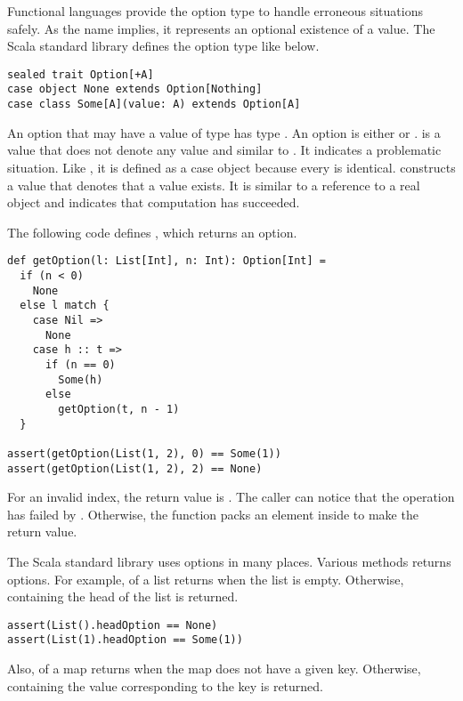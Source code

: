 Functional languages provide the option type to handle erroneous situations
safely. As the name implies, it represents an optional existence of a value.
The Scala standard library defines the option type like below.

\begin{verbatim}
sealed trait Option[+A]
case object None extends Option[Nothing]
case class Some[A](value: A) extends Option[A]
\end{verbatim}

An option that may have a value of type  has type .
An option is either  or .
 is a value that does not denote any value and similar
to . It indicates a problematic situation. Like , it is
defined as a case object because every  is identical.  constructs a value that
denotes that a value exists. It is similar to a reference to a real object and
indicates that computation has succeeded.

The following code defines , which returns an option.

\begin{verbatim}
def getOption(l: List[Int], n: Int): Option[Int] =
  if (n < 0)
    None
  else l match {
    case Nil =>
      None
    case h :: t =>
      if (n == 0)
        Some(h)
      else
        getOption(t, n - 1)
  }

assert(getOption(List(1, 2), 0) == Some(1))
assert(getOption(List(1, 2), 2) == None)
\end{verbatim}

For an invalid index, the return value is . The caller can notice
that the operation has failed by .
Otherwise, the function packs
an element inside  to make the return value.

The Scala standard library uses options in many places. Various methods returns options.
For example,  of a list returns  when the list is
empty. Otherwise,  containing the head of the list is returned.

\begin{verbatim}
assert(List().headOption == None)
assert(List(1).headOption == Some(1))
\end{verbatim}

Also,  of a map returns  when the map does not have a given key.
Otherwise,  containing the value corresponding to the key is
returned.

